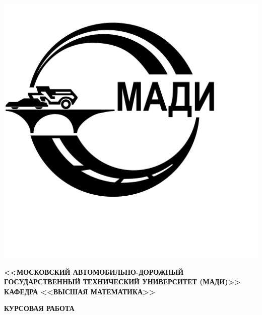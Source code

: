 \documentclass[12pt]{article}
\begin{document}
    \begin{titlepage}
        \thispagestyle{empty}
        \begin{center}
            \noindent\begin{minipage}{0.14\textwidth}
                         \includegraphics[width=\linewidth]{image/madi_logo}
            \end{minipage}%
            \begin{minipage}{0.86\textwidth}
                \center{\small{\vspace{\baselineskip}}}
            \end{minipage}
            \small{\textbf{<<МОСКОВСКИЙ АВТОМОБИЛЬНО-ДОРОЖНЫЙ ГОСУДАРСТВЕННЫЙ ТЕХНИЧЕСКИЙ УНИВЕРСИТЕТ (МАДИ)>>}}\\
            \vspace{0.2 cm}
            \scriptsize{{\textbf{КАФЕДРА <<ВЫСШАЯ МАТЕМАТИКА>> }}}
            \vspace{\baselineskip}

            \small{\textbf{КУРСОВАЯ РАБОТА}}\\
            \vspace{0.2 cm}


\end{center}
\end{titlepage}
\end{document}
